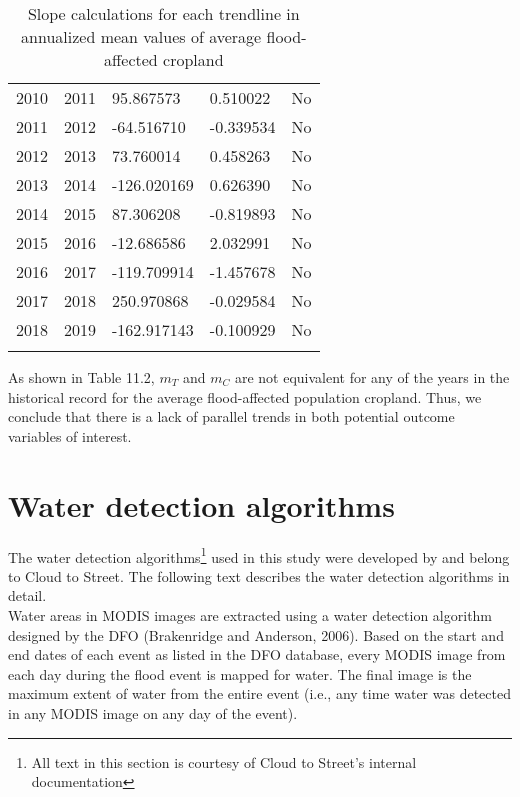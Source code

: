 \begin{longtable}{|p{1.2cm}|p{1.2cm}|p{2.2cm}|p{2cm}|p{1.5cm}|}
2010\rule{0pt}{4ex} & 2011 & 95.867573 & 0.510022 & No\\
2011\rule{0pt}{4ex} & 2012 & -64.516710 & -0.339534 & No\\
2012\rule{0pt}{4ex} & 2013 & 73.760014 & 0.458263 & No\\
2013\rule{0pt}{4ex} & 2014 & -126.020169 & 0.626390 & No\\
2014\rule{0pt}{4ex} & 2015 & 87.306208 & -0.819893 & No\\
2015\rule{0pt}{4ex} & 2016 & -12.686586 & 2.032991 & No\\
2016\rule{0pt}{4ex} & 2017 & -119.709914 & -1.457678 & No\\
2017\rule{0pt}{4ex} & 2018 & 250.970868 & -0.029584 & No\\
2018\rule{0pt}{4ex} & 2019 & -162.917143 & -0.100929 & No\\
\hline
\caption{Slope calculations for each trendline in annualized mean values of average flood-affected cropland}
\end{longtable}

As shown in Table 11.2, \({m_T}\) and \({m_C}\)  are not equivalent for any of the years in the historical record for the average flood-affected population cropland. Thus, we conclude that there is a lack of parallel trends in both potential outcome variables of interest.

\newpage
\section{Water detection algorithms}

The water detection algorithms\footnote{All text in this section is courtesy of Cloud to Street’s internal documentation} used in this study were developed by and belong to Cloud to Street. The following text describes the water detection algorithms in detail.\\

Water areas in MODIS images are extracted using a water detection algorithm designed by the DFO (Brakenridge and Anderson, 2006)\cite{brakenridge2006dartmouth}. Based on the start and end dates of each event as listed in the DFO database, every MODIS image from each day during the flood event is mapped for water. The final image is the maximum extent of water from the entire event (i.e., any time water was detected in any MODIS image on any day of the event).\\

